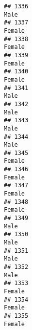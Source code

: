 \documentclass[]{article}
\begin{document}
\begin{verbatim}
## 1336                                                                                                                            Male
## 1337                                                                                                                          Female
## 1338                                                                                                                          Female
## 1339                                                                                                                          Female
## 1340                                                                                                                          Female
## 1341                                                                                                                            Male
## 1342                                                                                                                            Male
## 1343                                                                                                                            Male
## 1344                                                                                                                            Male
## 1345                                                                                                                          Female
## 1346                                                                                                                          Female
## 1347                                                                                                                          Female
## 1348                                                                                                                          Female
## 1349                                                                                                                            Male
## 1350                                                                                                                            Male
## 1351                                                                                                                            Male
## 1352                                                                                                                            Male
## 1353                                                                                                                          Female
## 1354                                                                                                                          Female
## 1355                                                                                                                          Female

\end{verbatim}
\end{document}
